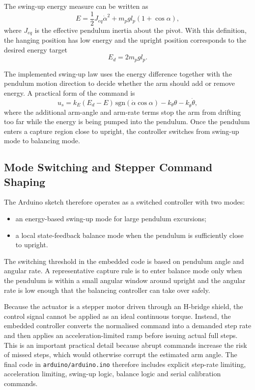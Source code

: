 \documentclass[conference]{IEEEtran}
\begin{document}
The swing-up energy measure can be written as
\begin{equation}
E = \frac{1}{2}J_{eq}\dot{\alpha}^{2} + m_{p}gl_{p}(1+\cos\alpha),
\end{equation}
where $J_{eq}$ is the effective pendulum inertia about the pivot. With this definition, the hanging position has low energy and the upright position corresponds to the desired energy target
\begin{equation}
E_{d} = 2m_{p}gl_{p}.
\end{equation}

The implemented swing-up law uses the energy difference together with the pendulum motion direction to decide whether the arm should add or remove energy. A practical form of the command is
\begin{equation}
u_{s} = k_{E}(E_{d} - E)\,\mathrm{sgn}(\dot{\alpha}\cos\alpha)
        - k_{\theta}\theta - k_{\dot{\theta}}\dot{\theta},
\end{equation}
where the additional arm-angle and arm-rate terms stop the arm from drifting too far while the energy is being pumped into the pendulum. Once the pendulum enters a capture region close to upright, the controller switches from swing-up mode to balancing mode.

\subsection{Mode Switching and Stepper Command Shaping}
The Arduino sketch therefore operates as a switched controller with two modes:
\begin{itemize}
\item an energy-based swing-up mode for large pendulum excursions;
\item a local state-feedback balance mode when the pendulum is sufficiently close to upright.
\end{itemize}

The switching threshold in the embedded code is based on pendulum angle and angular rate. A representative capture rule is to enter balance mode only when the pendulum is within a small angular window around upright and the angular rate is low enough that the balancing controller can take over safely.

Because the actuator is a stepper motor driven through an H-bridge shield, the control signal cannot be applied as an ideal continuous torque. Instead, the embedded controller converts the normalised command into a demanded step rate and then applies an acceleration-limited ramp before issuing actual full steps. This is an important practical detail because abrupt commands increase the risk of missed steps, which would otherwise corrupt the estimated arm angle. The final code in \texttt{arduino/arduino.ino} therefore includes explicit step-rate limiting, acceleration limiting, swing-up logic, balance logic and serial calibration commands.
\end{document}
